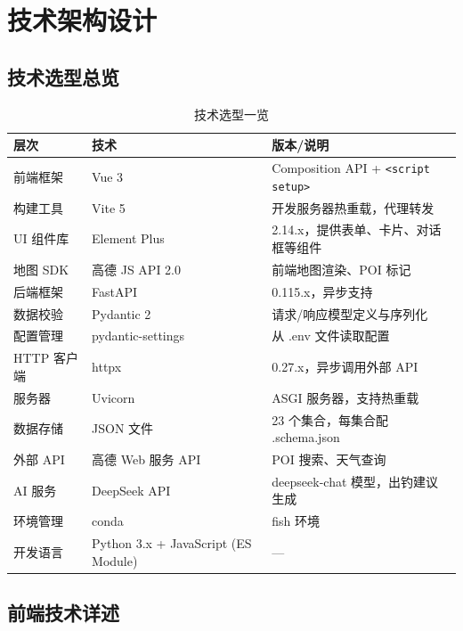 \documentclass[12pt,a4paper]{ctexart}
\begin{document}
\newpage

\section{技术架构设计}

\subsection{技术选型总览}

\begin{table}[H]
  \centering
  \caption{技术选型一览}
  \label{tab:tech-stack}
  \begin{tabular}{p{3cm}p{3cm}p{6cm}}
    \toprule
    \textbf{层次} & \textbf{技术} & \textbf{版本/说明} \\
    \midrule
    前端框架 & Vue 3 & Composition API + \texttt{<script setup>} \\
    构建工具 & Vite 5 & 开发服务器热重载，代理转发 \\
    UI 组件库 & Element Plus & 2.14.x，提供表单、卡片、对话框等组件 \\
    地图 SDK & 高德 JS API 2.0 & 前端地图渲染、POI 标记 \\
    后端框架 & FastAPI & 0.115.x，异步支持 \\
    数据校验 & Pydantic 2 & 请求/响应模型定义与序列化 \\
    配置管理 & pydantic-settings & 从 .env 文件读取配置 \\
    HTTP 客户端 & httpx & 0.27.x，异步调用外部 API \\
    服务器 & Uvicorn & ASGI 服务器，支持热重载 \\
    数据存储 & JSON 文件 & 23 个集合，每集合配 .schema.json \\
    外部 API & 高德 Web 服务 API & POI 搜索、天气查询 \\
    AI 服务 & DeepSeek API & deepseek-chat 模型，出钓建议生成 \\
    环境管理 & conda & fish 环境 \\
    开发语言 & Python 3.x + JavaScript (ES Module) & — \\
    \bottomrule
  \end{tabular}
\end{table}

\subsection{前端技术详述}
\end{document}
